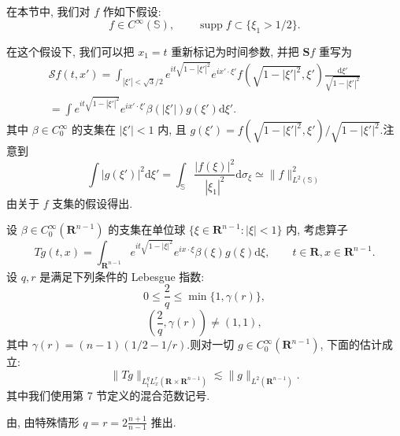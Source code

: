 
在本节中, 我们对 $f$ 作如下假设:
\begin{equation}
f \in C^\infty(\mathbb{S}), \qquad \operatorname{supp} f \subset \{\xi_1 > 1/2\}.\label{eq:c6-292}
\end{equation}

在这个假设下, 我们可以把 $x_1 = t$ 重新标记为时间参数, 并把 $\boldsymbol{S} f$ 重写为
\[
\begin{array}{c}
\mathcal{S} f(t, x') = \int_{|\xi'| < \sqrt{3}/2} e^{it\sqrt{1 - |\xi'|^2}} e^{ix' \cdot \xi'} f(\sqrt{1 - |\xi'|^2}, \xi') \frac{\mathrm{d}\xi'}{\sqrt{1 - |\xi'|^2}} \\
= \int e^{it\sqrt{1 - |\xi'|^2}} e^{ix' \cdot \xi'} \beta(|\xi'|) g(\xi') \mathrm{d}\xi'.
\end{array}
\]
其中 $\beta \in C_0^\infty$ 的支集在 $|\xi'| < 1$ 内, 且 $g(\xi') = f(\sqrt{1 - |\xi'|^2}, \xi')/\sqrt{1 - |\xi'|^2}$.注意到
\[
\int |g(\xi')|^2 \mathrm{d}\xi' = \int_{\mathbb{S}} \frac{|f(\xi)|^2}{|\xi_1|^2} \mathrm{d}\sigma_\xi \simeq \|f\|^2_{L^2(\mathbb{S})}
\]
由关于 $f$ 支集的假设得出.

\begin{theorem}\label{thm:c6-8.17}
设 $\beta \in C_0^\infty(\mathbf{R}^{n-1})$ 的支集在单位球 $\{\xi \in \mathbf{R}^{n-1}: |\xi| < 1\}$ 内, 考虑算子
\[
Tg(t, x) = \int_{\mathbf{R}^{n-1}} e^{it\sqrt{1 - |\xi|^2}} e^{ix \cdot \xi} \beta(\xi) g(\xi) \mathrm{d}\xi, \qquad t \in \mathbf{R}, x \in \mathbf{R}^{n-1}.
\]
设 $q, r$ 是满足下列条件的 Lebesgue 指数:
\begin{equation}
0 \leq \frac{2}{q} \leq \min\{1, \gamma(r)\}, \label{eq:c6-293}
\end{equation}
\begin{equation}
\left(\frac{2}{q}, \gamma(r)\right) \neq (1, 1), \label{eq:c6-294}
\end{equation}
其中 $\gamma(r) = (n-1)(1/2 - 1/r)$.则对一切 $g \in C_0^\infty(\mathbf{R}^{n-1})$, 下面的估计成立:
\begin{equation}
\|Tg\|_{L^q_t L^r_x(\mathbf{R} \times \mathbf{R}^{n-1})} \lesssim \|g\|_{L^2(\mathbf{R}^{n-1})}.\label{eq:c6-295}
\end{equation}
其中我们使用第 7 节定义的混合范数记号.

由,  由特殊情形 $q = r = 2\frac{n+1}{n-1}$ 推出.
\end{theorem}


